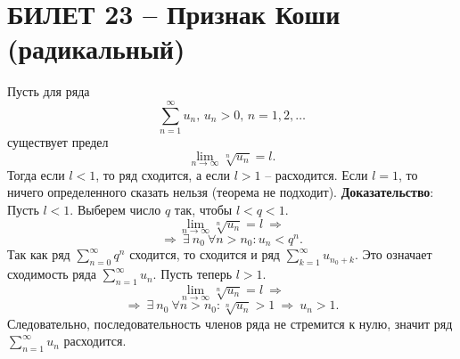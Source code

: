 \documentclass{article}
\begin{document}
\section{БИЛЕТ 23 -- Признак Коши (радикальный)}
Пусть для ряда 
$$ \sum_{n=1}^{\infty}u_{n},\,u_{n}>0,\,n=1,2,\ldots $$
существует предел
$$ \lim_{n\to\infty}\sqrt[n]{u_{n}}=l. $$
Тогда если $l<1$, то ряд сходится, а если $l>1$ -- расходится.
\newline
\newline
Если $l=1$, то ничего определенного сказать нельзя (теорема не подходит).
\newline
\newline
\textbf{Доказательство}:
\newline
\newline
Пусть $l<1$. Выберем число $q$ так, чтобы $l<q<1.$
$$ \lim_{n\to\infty}\sqrt[n]{u_{n}}=l \:\Rightarrow $$
$$ \Rightarrow\:\exists\:n_{0}\:\forall n>n_{0}:u_{n}<q^{n}.$$
Так как ряд $\sum_{n=0}^{\infty}q^{n}$ сходится, то сходится и ряд $\sum_{k=1}^{\infty}u_{n_{0}+k}.$ Это означает сходимость ряда $\sum_{n=1}^{\infty} u_{n}.$
\newline
\newline
Пусть теперь $l>1.$
$$ \lim_{n\to\infty}\sqrt[n]{u_{n}}=l \:\Rightarrow $$
$$ \Rightarrow\:\exists\:n_{0}\:\forall n>n_{0}: \sqrt[n]{u_{n}}>1\:\Rightarrow\:u_{n}>1.$$
Следовательно, последовательность членов ряда не стремится к нулю, значит ряд $\sum_{n=1}^{\infty} u_{n}$ расходится.
\newpage
\end{document}
